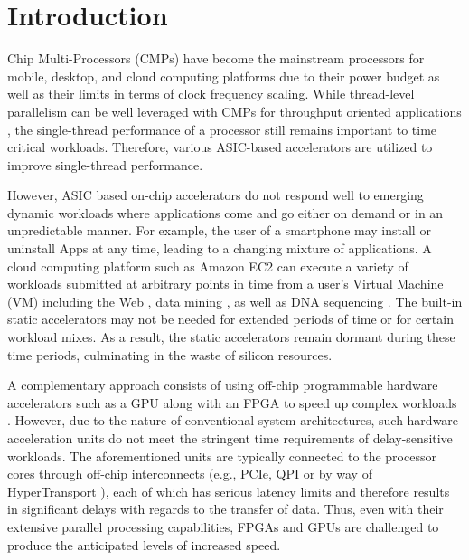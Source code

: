 
\section{Introduction}


Chip Multi-Processors (CMPs) have become the mainstream processors for
mobile, desktop, and cloud computing platforms due to their power
budget as well as their limits in terms of clock frequency scaling. While
thread-level parallelism can be well leveraged with CMPs
for throughput oriented applications \cite{CMP05}, the single-thread performance of
a processor still remains important to time critical workloads. Therefore,
various ASIC-based accelerators are utilized to improve single-thread performance. 

However, ASIC based on-chip accelerators do not respond well to
emerging dynamic workloads where applications come and go either on
demand or in an unpredictable manner. For example, the user of a smartphone may
install or uninstall Apps at any time, leading to a changing mixture
of applications. A cloud computing platform such as Amazon EC2
\cite{amazon-ec2} can execute a variety of workloads submitted at arbitrary points in time from a user's Virtual Machine (VM) 
 including the Web \cite{Chen:2012jo}, data mining \cite{ec2-datamining}, as well as DNA sequencing
\cite{ec2-dna}.  The built-in static accelerators may not be needed for extended periods of time
or for certain workload mixes.  As a result, the static accelerators remain dormant during these time periods, 
culminating in the waste of silicon resources.

A complementary approach consists of using off-chip programmable hardware
accelerators such as a GPU along with an FPGA to speed up complex workloads
\cite{GPUFPGA, fpga-acc}. However, due to the nature of conventional system architectures, 
such hardware acceleration units do not meet the stringent time requirements 
of delay-sensitive workloads. The aforementioned units are typically
connected to the processor cores through off-chip interconnects
(e.g., PCIe, QPI \cite{intel-qpi} or by way of HyperTransport
\cite{amd-hypertransport}), each of which has serious latency limits and therefore results in
significant delays with regards to the transfer of data. Thus, even with their extensive
parallel processing capabilities, FPGAs and GPUs are challenged to produce the anticipated levels
of increased speed.  

